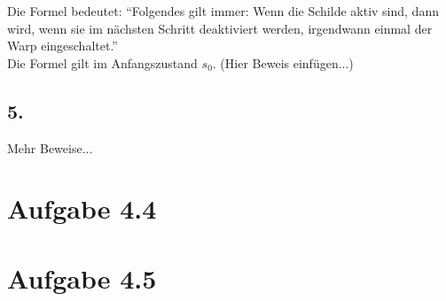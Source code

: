 \documentclass[12pt, paper=a4]{article}
\begin{document}
Die Formel bedeutet: ``Folgendes gilt immer: Wenn die Schilde aktiv sind, dann wird, wenn sie im nächsten Schritt deaktiviert werden, irgendwann einmal der Warp eingeschaltet.''\\

Die Formel gilt im Anfangszustand $s_0$. (Hier Beweis einfügen...)\\

\subsection*{5.}
Mehr Beweise...\\

\section*{Aufgabe 4.4}

\section*{Aufgabe 4.5}
\end{document}
